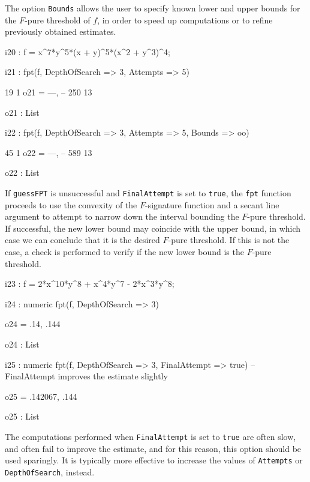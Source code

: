 \documentclass{amsart}
\begin{document}
The option \texttt{Bounds} allows the user to specify known lower and upper bounds for the $F$-pure threshold of $f$, in order to speed up computations or to refine previously obtained estimates.

\smallskip
{\small
{}
\begin{MyVerbatim}
i20 : f = x^7*y^5*(x + y)^5*(x^2 + y^3)^4;

i21 : fpt(f, DepthOfSearch => 3, Attempts => 5)

        19   1
o21 = {---, --}
       250  13

o21 : List

i22 : fpt(f, DepthOfSearch => 3, Attempts => 5, Bounds => oo)

        45   1
o22 = {---, --}
       589  13

o22 : List
\end{MyVerbatim}
}
\smallskip

If \texttt{guessFPT} is unsuccessful and \texttt{FinalAttempt} is set to \texttt{true}, the \texttt{fpt} function proceeds to use the convexity of the $F$-signature function and a secant line argument to attempt to narrow down the interval bounding the $F$-pure threshold.
If successful, the new lower bound may coincide with the upper bound, in which case we can conclude that it is the desired $F$-pure threshold.
If this is not the case, a check is performed to verify if the new lower bound is the $F$-pure threshold.

\smallskip
{\small
{}
\begin{MyVerbatim}
i23 : f = 2*x^10*y^8 + x^4*y^7 - 2*x^3*y^8;

i24 : numeric fpt(f, DepthOfSearch => 3)

o24 = {.14, .144}

o24 : List

i25 : numeric fpt(f, DepthOfSearch => 3, FinalAttempt => true)
      -- FinalAttempt improves the estimate slightly

o25 = {.142067, .144}

o25 : List
\end{MyVerbatim}
}
\smallskip

The computations performed when \texttt{FinalAttempt} is set to \texttt{true} are often slow, and often fail to improve the estimate, and for this reason, this option should be used sparingly.
It is typically more effective to increase the values of \texttt{Attempts} or \texttt{DepthOfSearch}, instead.
\end{document}
